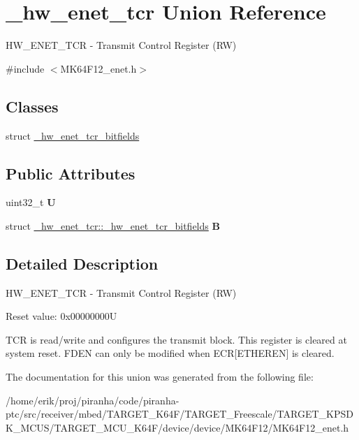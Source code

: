 \hypertarget{union__hw__enet__tcr}{}\section{\+\_\+hw\+\_\+enet\+\_\+tcr Union Reference}
\label{union__hw__enet__tcr}


H\+W\+\_\+\+E\+N\+E\+T\+\_\+\+T\+CR -\/ Transmit Control Register (RW)  




{\ttfamily \#include $<$M\+K64\+F12\+\_\+enet.\+h$>$}

\subsection*{Classes}
\begin{DoxyCompactItemize}
\item 
struct \hyperlink{struct__hw__enet__tcr_1_1__hw__enet__tcr__bitfields}{\+\_\+hw\+\_\+enet\+\_\+tcr\+\_\+bitfields}
\end{DoxyCompactItemize}
\subsection*{Public Attributes}
\begin{DoxyCompactItemize}
\item 
uint32\+\_\+t {\bfseries U}\hypertarget{union__hw__enet__tcr_a8ac1814af4ed5f90b6de5e440208acdf}{}\label{union__hw__enet__tcr_a8ac1814af4ed5f90b6de5e440208acdf}

\item 
struct \hyperlink{struct__hw__enet__tcr_1_1__hw__enet__tcr__bitfields}{\+\_\+hw\+\_\+enet\+\_\+tcr\+::\+\_\+hw\+\_\+enet\+\_\+tcr\+\_\+bitfields} {\bfseries B}\hypertarget{union__hw__enet__tcr_ab7e9f0714e510dde33bf59b55677a732}{}\label{union__hw__enet__tcr_ab7e9f0714e510dde33bf59b55677a732}

\end{DoxyCompactItemize}


\subsection{Detailed Description}
H\+W\+\_\+\+E\+N\+E\+T\+\_\+\+T\+CR -\/ Transmit Control Register (RW) 

Reset value\+: 0x00000000U

T\+CR is read/write and configures the transmit block. This register is cleared at system reset. F\+D\+EN can only be modified when E\+CR\mbox{[}E\+T\+H\+E\+R\+EN\mbox{]} is cleared. 

The documentation for this union was generated from the following file\+:\begin{DoxyCompactItemize}
\item 
/home/erik/proj/piranha/code/piranha-\/ptc/src/receiver/mbed/\+T\+A\+R\+G\+E\+T\+\_\+\+K64\+F/\+T\+A\+R\+G\+E\+T\+\_\+\+Freescale/\+T\+A\+R\+G\+E\+T\+\_\+\+K\+P\+S\+D\+K\+\_\+\+M\+C\+U\+S/\+T\+A\+R\+G\+E\+T\+\_\+\+M\+C\+U\+\_\+\+K64\+F/device/device/\+M\+K64\+F12/M\+K64\+F12\+\_\+enet.\+h\end{DoxyCompactItemize}

